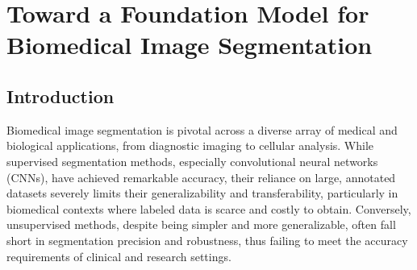 \documentclass[./dissertation.tex]{subfiles}
\begin{document}
\chapter{Toward a Foundation Model for Biomedical Image Segmentation}
\label{ch:foundation}
\section{Introduction}


Biomedical image segmentation is pivotal across a diverse array of medical and biological applications, from diagnostic imaging to cellular analysis. While supervised segmentation methods, especially convolutional neural networks (CNNs), have achieved remarkable accuracy, their reliance on large, annotated datasets severely limits their generalizability and transferability, particularly in biomedical contexts where labeled data is scarce and costly to obtain. Conversely, unsupervised methods, despite being simpler and more generalizable, often fall short in segmentation precision and robustness, thus failing to meet the accuracy requirements of clinical and research settings.


\end{document}
